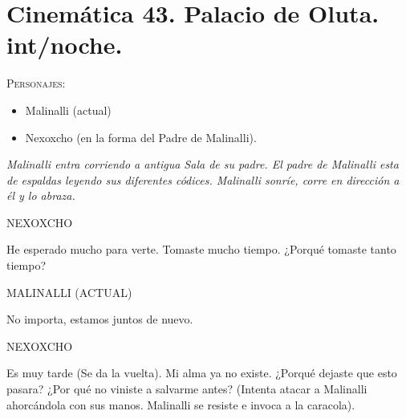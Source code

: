 \documentclass[11pt,letterpaper]{article}
\begin{document}
\section{Cinemática 43. Palacio de Oluta. int/noche. }
 \textsc{Personajes}:
 \begin{itemize}
 \item Malinalli (actual)
\item Nexoxcho (en la forma del Padre de Malinalli).
 \end{itemize}
\textit{Malinalli entra corriendo a antigua Sala de su padre. El padre de Malinalli esta de espaldas leyendo sus diferentes códices. Malinalli sonríe, corre en dirección a él y lo abraza. }
\begin{center}
NEXOXCHO
\\
\par 
He esperado mucho para verte. Tomaste mucho tiempo. ¿Porqué tomaste tanto tiempo?
\\
\par 
MALINALLI (ACTUAL)
\\
\par 
No importa, estamos juntos de nuevo.
\\
\par 
NEXOXCHO
\\
\par 
Es muy tarde (Se da la vuelta). Mi alma ya no existe. ¿Porqué dejaste que esto pasara? ¿Por qué no viniste a salvarme antes? (Intenta atacar a Malinalli ahorcándola con sus manos. Malinalli se resiste e invoca a la caracola). 
\end{center}
\end{document}
